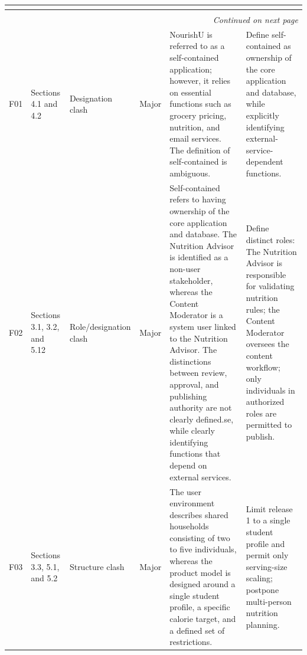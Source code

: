 \documentclass[11pt,a4paper]{article}
\renewcommand{\arraystretch}{1.15}
\begin{document}
\begin{landscape}
\begin{center}
\scriptsize
\setlength{\tabcolsep}{2.5pt}
\renewcommand{\arraystretch}{1.18}
\begin{longtable}{|p{0.9cm}|p{2.1cm}|p{2.4cm}|p{1.35cm}|p{8.4cm}|p{8.4cm}|}
\hline
\rowcolor{headerblue} \textbf{\color{white}{ID}} & \textbf{\color{white}{Location}} & \textbf{\color{white}{Defect type}} & \textbf{\color{white}{Severity}} & \textbf{\color{white}{Inspection finding}} & \textbf{\color{white}{Recommended correction}} \\ \hline
\endfirsthead
\hline
\rowcolor{headerblue} \textbf{\color{white}{ID}} & \textbf{\color{white}{Location}} & \textbf{\color{white}{Defect type}} & \textbf{\color{white}{Severity}} & \textbf{\color{white}{Inspection finding}} & \textbf{\color{white}{Recommended correction}} \\ \hline
\endhead
\hline
\multicolumn{6}{r}{\small\itshape Continued on next page}\\
\endfoot
\hline
\endlastfoot
F01 & Sections 4.1 and 4.2 & Designation clash & Major & NourishU is referred to as a self-contained application; however, it relies on essential functions such as grocery pricing, nutrition, and email services. The definition of self-contained is ambiguous. & Define self-contained as ownership of the core application and database, while explicitly identifying external-service-dependent functions. \\ \hline
F02 & Sections 3.1, 3.2, and 5.12 & Role/designation clash & Major & Self-contained refers to having ownership of the core application and database. The Nutrition Advisor is identified as a non-user stakeholder, whereas the Content Moderator is a system user linked to the Nutrition Advisor. The distinctions between review, approval, and publishing authority are not clearly defined.se, while clearly identifying functions that depend on external services. & Define distinct roles: The Nutrition Advisor is responsible for validating nutrition rules; the Content Moderator oversees the content workflow; only individuals in authorized roles are permitted to publish. \\ \hline
F03 & Sections 3.3, 5.1, and 5.2 & Structure clash & Major & The user environment describes shared households consisting of two to five individuals, whereas the product model is designed around a single student profile, a specific calorie target, and a defined set of restrictions. & Limit release 1 to a single student profile and permit only serving-size scaling; postpone multi-person nutrition planning. \\ \hline

\end{longtable}
\end{center}
\end{landscape}
\end{document}
